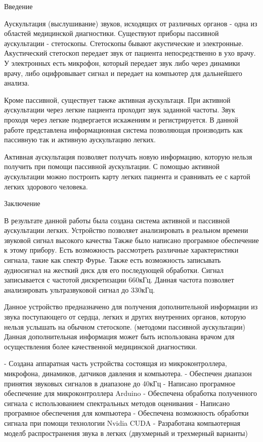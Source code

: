 Введение

Аускультация (выслушивание) звуков, исходящих от различных органов - одна из областей медицинской диагностики. Существуют приборы пассивной аускультации - стетоскопы. Стетоскопы бывают акустические и электронные. Акустический стетоскоп передает звук от пациента непосредственно в ухо врачу. У электронных есть микрофон, который передает звук либо через динамики врачу, либо оцифровывает сигнал и передает на компьютер для дальнейшего анализа.

Кроме пассивной, существует также активная аускультаця. При активной аускультации через легкие пациента проходит звук заданной частоты. Звук проходя через легкие подвергается искажениям и регистрируется. В данной работе представлена информационная система позволяющая производить как пассивную так и активную аускультацию легких.


Активная аускультация позволяет получать новую информацию, которую нельзя получить при помощи пассивной аускультации. С помощью активной аускультации можно построить карту легких пациента и сравнивать ее с картой легких здорового человека.


Заключение

В результате данной работы была создана система активной и пассивной аускультации легких. Устройство позволяет анализировать в реальном времени звуковой сигнал высокого качества Также было написано програмное обеспечение к этому прибору. Есть возможность рассмотреть различные характеристики сигнала, такие как спектр Фурье. Также есть возможность записывать аудиосигнал на жесткий диск для его последующей обработки. Сигнал записывается с частотой дискретизации 660кГц. Данная частота позволяет анализировать ультразвуковой сигнал до 330кГц.

Данное устройство предназначено для получения дополнительной информации из звука поступающего от сердца, легких и других внутренних органов, которую нельзя услышать на обычном стетоскопе. (методоми пассивной аускультации) Данная дополнительная информация может быть использована врачом для осуществления более качественной медицинской диагностики.

- Создана аппаратная часть устройства состоящая из микроконтроллера, микрофона, динамиков, датчиков давления и компьютера.
- Обеспечен диапазон принятия звуковых сигналов в диапазоне до 40кГц
- Написано програмное обеспечение для микроконтроллера Arduino
- Обеспечена обработка полученного сигнала с использованием спектральных методов оценивания
- Написано програмное обеспечения для компьютера
- Обеспечена возможность обработки сигнала при помощи технологии Nvidia CUDA
- Разработана компьютерная моделб распространения звука в легких (двухмерный и трехмерный варианты)
